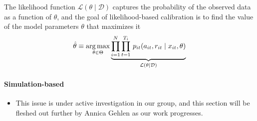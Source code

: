 \noindent The likelihood function $\mathcal{L}(\theta\mid\mathcal{D})$ captures the probability of the observed data as a function of $\theta$, and the goal of likelihood-based calibration is to find the value of the model parameters $\theta$ that maximizes it
%
\begin{align*}
  \hat{\theta} \equiv \operatorname*{arg\,max}_{\theta \in \Theta}  \underbrace{\prod^N_{i= 1} \prod^{T_i}_{t= 1}\, p_{it}(a_{it}, r_{it} \mid x_{it}, \theta)}_{\mathcal{L}(\theta\mid\mathcal{D})}
\end{align*}

\paragraph{Simulation-based}

\begin{itemize}
  \item This issue is under active investigation in our group, and this section will be fleshed out further by Annica Gehlen as our work progresses.
\end{itemize}
